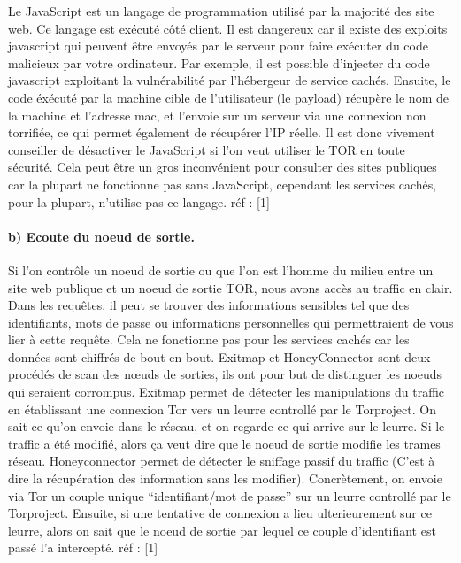 \documentclass[]{article}
\let\oldparagraph\paragraph
\renewcommand{\paragraph}[1]{\oldparagraph{#1}\mbox{}}
\begin{document}
Le JavaScript est un langage de programmation utilisé par la majorité
des site web. Ce langage est exécuté côté client. Il est dangereux car
il existe des exploits javascript qui peuvent être envoyés par le
serveur pour faire exécuter du code malicieux par votre ordinateur. Par
exemple, il est possible d'injecter du code javascript exploitant la
vulnérabilité par l'hébergeur de service cachés. Ensuite, le code
éxécuté par la machine cible de l'utilisateur (le payload) récupère le
nom de la machine et l'adresse mac, et l'envoie sur un serveur via une
connexion non torrifiée, ce qui permet également de récupérer l'IP
réelle. Il est donc vivement conseiller de désactiver le JavaScript si
l'on veut utiliser le TOR en toute sécurité. Cela peut être un gros
inconvénient pour consulter des sites publiques car la plupart ne
fonctionne pas sans JavaScript, cependant les services cachés, pour la
plupart, n'utilise pas ce langage. réf : {[}1{]}

\paragraph{b) Ecoute du noeud de
sortie.}\label{b-ecoute-du-noeud-de-sortie.}

Si l'on contrôle un noeud de sortie ou que l'on est l'homme du milieu
entre un site web publique et un noeud de sortie TOR, nous avons accès
au traffic en clair. Dans les requêtes, il peut se trouver des
informations sensibles tel que des identifiants, mots de passe ou
informations personnelles qui permettraient de vous lier à cette
requête. Cela ne fonctionne pas pour les services cachés car les données
sont chiffrés de bout en bout. Exitmap et HoneyConnector sont deux
procédés de scan des nœuds de sorties, ils ont pour but de distinguer
les noeuds qui seraient corrompus. Exitmap permet de détecter les
manipulations du traffic en établissant une connexion Tor vers un leurre
controllé par le Torproject. On sait ce qu'on envoie dans le réseau, et
on regarde ce qui arrive sur le leurre. Si le traffic a été modifié,
alors ça veut dire que le noeud de sortie modifie les trames réseau.
Honeyconnector permet de détecter le sniffage passif du traffic (C'est à
dire la récupération des information sans les modifier). Concrètement,
on envoie via Tor un couple unique ``identifiant/mot de passe'' sur un
leurre controllé par le Torproject. Ensuite, si une tentative de
connexion a lieu ulterieurement sur ce leurre, alors on sait que le
noeud de sortie par lequel ce couple d'identifiant est passé l'a
intercepté. réf : {[}1{]}
\end{document}
